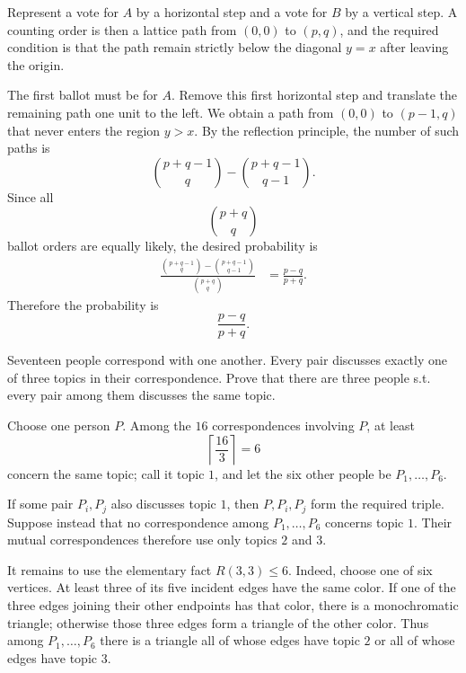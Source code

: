     \begin{solution}
        Represent a vote for $A$ by a horizontal step and a vote for $B$ by a
        vertical step. A counting order is then a lattice path from $(0,0)$ to
        $(p,q)$, and the required condition is that the path remain strictly
        below the diagonal $y=x$ after leaving the origin.

        The first ballot must be for $A$. Remove this first horizontal step and
        translate the remaining path one unit to the left. We obtain a path
        from $(0,0)$ to $(p-1,q)$ that never enters the region $y>x$.
        By the reflection principle, the number of such paths is
        \[
            \binom{p+q-1}{q}
            -
            \binom{p+q-1}{q-1}.
        \]
        Since all
        \[
            \binom{p+q}{q}
        \]
        ballot orders are equally likely, the desired probability is
        \[
            \begin{aligned}
                \frac{
                    \binom{p+q-1}{q}-\binom{p+q-1}{q-1}
                }{
                    \binom{p+q}{q}
                }
                &=
                \frac{p-q}{p+q}.
            \end{aligned}
        \]
        Therefore the probability is
        \[
            \boxed{\frac{p-q}{p+q}}.
        \]
    \end{solution}

    \begin{expectedproblem}[1964 IMO]
        Seventeen people correspond with one another. Every pair discusses
        exactly one of three topics in their correspondence. Prove that there
        are three people s.t. every pair among them discusses the same
        topic.
    \end{expectedproblem}

    \begin{solution}
        Choose one person $P$. Among the $16$ correspondences involving $P$,
        at least
        \[
            \left\lceil\frac{16}{3}\right\rceil=6
        \]
        concern the same topic; call it topic $1$, and let the six other people
        be $P_1,\ldots,P_6$.

        If some pair $P_i,P_j$ also discusses topic $1$, then
        $P,P_i,P_j$ form the required triple. Suppose instead that no
        correspondence among $P_1,\ldots,P_6$ concerns topic $1$. Their mutual
        correspondences therefore use only topics $2$ and $3$.

        It remains to use the elementary fact $R(3,3)\leq6$. Indeed, choose one
        of six vertices. At least three of its five incident edges have the
        same color. If one of the three edges joining their other endpoints has
        that color, there is a monochromatic triangle; otherwise those three
        edges form a triangle of the other color. Thus among
        $P_1,\ldots,P_6$ there is a triangle all of whose edges have topic $2$
        or all of whose edges have topic $3$.
    \end{solution}

